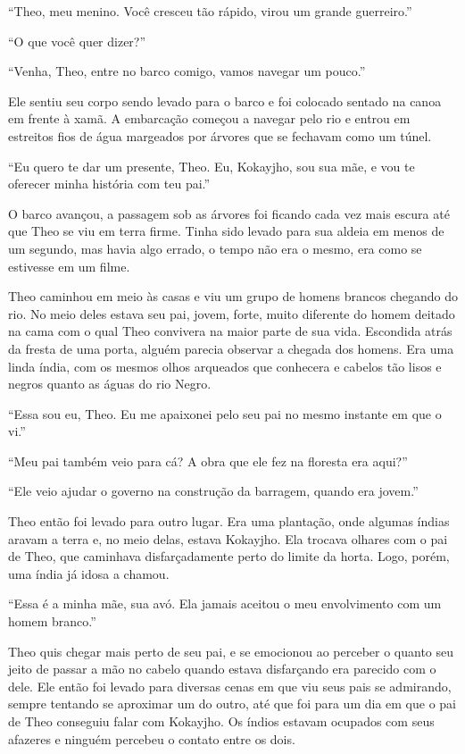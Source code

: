 ``Theo, meu menino. Você cresceu tão rápido, virou um grande
guerreiro.''

``O que você quer dizer?''

``Venha, Theo, entre no barco comigo, vamos navegar um pouco.''

Ele sentiu seu corpo sendo levado para o barco e foi colocado sentado na
canoa em frente à xamã. A embarcação começou a navegar pelo rio e entrou
em estreitos fios de água margeados por árvores que se fechavam como um
túnel.

``Eu quero te dar um presente, Theo. Eu, Kokayjho, sou sua mãe, e vou te
oferecer minha história com teu pai.''

O barco avançou, a passagem sob as árvores foi ficando cada vez mais
escura até que Theo se viu em terra firme. Tinha sido levado para sua
aldeia em menos de um segundo, mas havia algo errado, o tempo não era o
mesmo, era como se estivesse em um filme.

Theo caminhou em meio às casas e viu um grupo de homens brancos chegando
do rio. No meio deles estava seu pai, jovem, forte, muito diferente do
homem deitado na cama com o qual Theo convivera na maior parte de sua
vida. Escondida atrás da fresta de uma porta, alguém parecia observar a
chegada dos homens. Era uma linda índia, com os mesmos olhos arqueados
que conhecera e cabelos tão lisos e negros quanto as águas do rio Negro.

``Essa sou eu, Theo. Eu me apaixonei pelo seu pai no mesmo instante em
que o vi.''

``Meu pai também veio para cá? A obra que ele fez na floresta era
aqui?''

``Ele veio ajudar o governo na construção da barragem, quando era
jovem.''

Theo então foi levado para outro lugar. Era uma plantação, onde algumas
índias aravam a terra e, no meio delas, estava Kokayjho. Ela trocava
olhares com o pai de Theo, que caminhava disfarçadamente perto do limite
da horta. Logo, porém, uma índia já idosa a chamou.

``Essa é a minha mãe, sua avó. Ela jamais aceitou o meu envolvimento com
um homem branco.''

Theo quis chegar mais perto de seu pai, e se emocionou ao perceber o
quanto seu jeito de passar a mão no cabelo quando estava disfarçando era
parecido com o dele. Ele então foi levado para diversas cenas em que viu
seus pais se admirando, sempre tentando se aproximar um do outro, até
que foi para um dia em que o pai de Theo conseguiu falar com Kokayjho.
Os índios estavam ocupados com seus afazeres e ninguém percebeu o
contato entre os dois.

